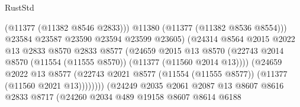 \begin{lexlean}{RustStd}
\begin{coremodule}
                                              (@11377 (@11382 @8546 @2833)))
                                            @11380
                                            (@11377 (@11382 @8536 @8554)))
                                          @23584
                                          @23587
                                          @23590
                                          @23594
                                          @23599
                                          @23605)
                                        (@24314
                                          @8564
                                          @2015
                                          @2022
                                          @13
                                          @2833
                                          @8570
                                          @2833
                                          @8577
                                          (@24659
                                            @2015
                                            @13
                                            @8570
                                            (@22743
                                              @2014
                                              @8570
                                              (@11554 (@11555 @8570))
                                              (@11377 (@11560 @2014 @13))))
                                          (@24659
                                            @2022
                                            @13
                                            @8577
                                            (@22743
                                              @2021
                                              @8577
                                              (@11554 (@11555 @8577))
                                              (@11377 (@11560 @2021 @13))))))))
                                  (@24249
                                    @2035
                                    @2061
                                    @2087
                                    @13
                                    @8607
                                    @8616
                                    @2833
                                    @8717
                                    (@24260
                                      @2034
                                      @489
                                      @19158
                                      @8607
                                      @8614
                                      @6188

\end{coremodule}
\end{lexlean}
